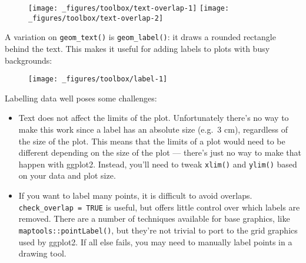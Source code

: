 \begin{itemize}
  \begin{figure}[H]
    \texttt{[image: \_figures/toolbox/text-overlap-1]}%
    \texttt{[image: \_figures/toolbox/text-overlap-2]}
  \end{figure}
\end{itemize}

A variation on \texttt{geom\_text()} is \texttt{geom\_label()}: it draws
a rounded rectangle behind the text. This makes it useful for adding
labels to plots with busy backgrounds: 

\begin{Shaded}
\begin{Highlighting}[]
\StringTok{ }\NormalTok{(}
   \NormalTok{(}\NormalTok{, }\NormalTok{), }
   \NormalTok{(}\NormalTok{, }\NormalTok{), }
   \NormalTok{(}\NormalTok{, }\NormalTok{)}
\NormalTok{)}

\OperatorTok{+}
\StringTok{  }\NormalTok{(}\NormalTok{(}\OperatorTok{+}\StringTok{ }
\StringTok{  }\NormalTok{(}\NormalTok{(}
\end{Highlighting}
\end{Shaded}

\begin{figure}[H]
  \centering
  \texttt{[image: \_figures/toolbox/label-1]}
\end{figure}

Labelling data well poses some challenges:

\begin{itemize}
\item
  Text does not affect the limits of the plot. Unfortunately there's no
  way to make this work since a label has an absolute size (e.g.~3 cm),
  regardless of the size of the plot. This means that the limits of a
  plot would need to be different depending on the size of the plot ---
  there's just no way to make that happen with ggplot2. Instead, you'll
  need to tweak \texttt{xlim()} and \texttt{ylim()} based on your data
  and plot size.
\item
  If you want to label many points, it is difficult to avoid overlaps.
  \texttt{check\_overlap\ =\ TRUE} is useful, but offers little control
  over which labels are removed. There are a number of techniques
  available for base graphics, like \texttt{maptools::pointLabel()}, but
  they're not trivial to port to the grid graphics used by ggplot2. If
  all else fails, you may need to manually label points in a drawing
  tool.
\end{itemize}

